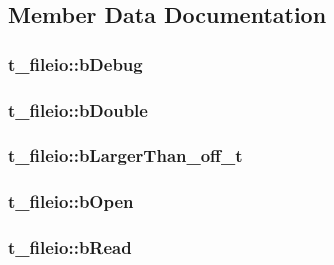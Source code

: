 \subsection{\-Member \-Data \-Documentation}
\hypertarget{structt__fileio_a7f025d80ebd39e59fa889855f3a3f8cc}{
\subsubsection[{b\-Debug}]{ {\bf t\-\_\-fileio\-::b\-Debug}}}\label{structt__fileio_a7f025d80ebd39e59fa889855f3a3f8cc}
\hypertarget{structt__fileio_a4aed89630667f5cf17152991c4a1a8bc}{
\subsubsection[{b\-Double}]{ {\bf t\-\_\-fileio\-::b\-Double}}}\label{structt__fileio_a4aed89630667f5cf17152991c4a1a8bc}
\hypertarget{structt__fileio_a4010ab5aa2568a04d882ee82a82e0a6c}{
\subsubsection[{b\-Larger\-Than\-\_\-off\-\_\-t}]{ {\bf t\-\_\-fileio\-::b\-Larger\-Than\-\_\-off\-\_\-t}}}\label{structt__fileio_a4010ab5aa2568a04d882ee82a82e0a6c}
\hypertarget{structt__fileio_a00003e844767c3781604291e31c0f8cc}{
\subsubsection[{b\-Open}]{ {\bf t\-\_\-fileio\-::b\-Open}}}\label{structt__fileio_a00003e844767c3781604291e31c0f8cc}
\hypertarget{structt__fileio_af6a2369ea216bf53c6a3a21fe0ef4ece}{
\subsubsection[{b\-Read}]{ {\bf t\-\_\-fileio\-::b\-Read}}}\label{structt__fileio_af6a2369ea216bf53c6a3a21fe0ef4ece}
